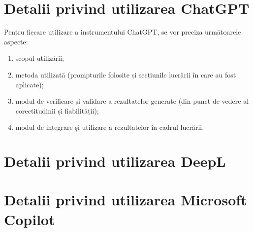 \documentclass[12pt,a4paper]{report}
\theoremstyle{definition}
\theoremstyle{remark}
\begin{document}
\section{Detalii privind utilizarea ChatGPT}
\label{sectionGhatGPT}
Pentru fiecare utilizare a instrumentului ChatGPT, se vor preciza următoarele aspecte:
\begin{enumerate}
\item scopul utilizării;
\item metoda utilizată (prompturile folosite și secțiunile lucrării în care au fost aplicate);
\item modul de verificare și validare a rezultatelor generate (din punct de vedere al corectitudinii și fiabilității);
\item modul de integrare și utilizare a rezultatelor în cadrul lucrării.
\end{enumerate}
\section{Detalii privind utilizarea DeepL}
\label{sectionDeepL}
\section{Detalii privind utilizarea Microsoft Copilot}
\label{sectionCopilot}
\end{document}
